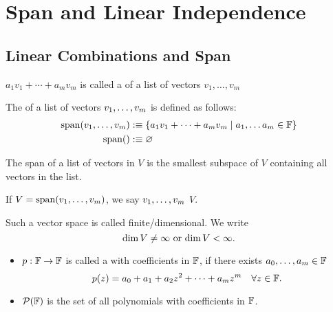 \section{Span and Linear Independence}
\subsection{Linear Combinations and Span}

\setcounter{thm}{1}
\begin{mydef} 
  $a_1 v_1 + \cdots + a_m v_m$ is called a  of a list of vectors $v_1, \dots, v_m$
\end{mydef}

\setcounter{thm}{3}
\begin{mydef} 
	The  of a list of vectors $v_1, \dots, v_m$ is defined as follows:
  \begin{equation}
    \begin{aligned}
      \operatorname{span} (v_1, \dots, v_m) &:\equiv \{a_1 v_1 + \cdots + a_m v_m \mid a_1, \dots a_m \in \mathbb{F} \}\\
      \operatorname{span} ( ) &:\equiv \varnothing
    \end{aligned}
  \end{equation}
\end{mydef}

\setcounter{thm}{5}
\begin{thm} 
  The  span of a list of vectors in $V$ is the smallest subspace of $V$ containing all vectors in the list.
\end{thm}

\begin{mydef} 
  If $V=\operatorname{span} (v_1, \dots, v_m)$, we say $v_1, \dots, v_m$  $V$.
\end{mydef}

\setcounter{thm}{8}
\begin{mydef} 
  Such a vector space is called finite\-/dimensional. We write
  \begin{equation}
    \dim V \neq \infty$ or $\dim V < \infty.
  \end{equation}
\end{mydef}


\begin{mydef}
  \phantom{.}
  \begin{itemize}
    \item $p: \mathbb{F} \to \mathbb{F}$ is called a  with coefficients in $\mathbb{F}$, if there exists $a_0, \ldots, a_m \in \mathbb{F}$ \st
    \begin{equation}
      p(z)=a_0 + a_1 + a_2z^2 + \cdots + a_m z^m \quad \forall z \in \mathbb{F}.
    \end{equation}
    \item $\mathcal{P} (\mathbb{F})$ is the set of all polynomials with coefficients in $\mathbb{F}$.
  \end{itemize}
\end{mydef}

